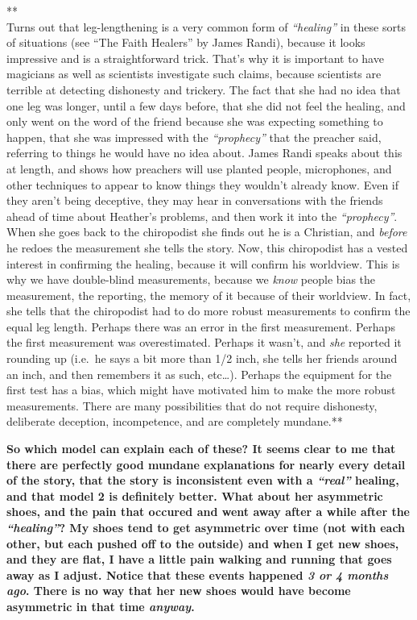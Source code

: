 **\\Turns out that leg-lengthening is a very common form of
\emph{``healing''} in these sorts of situations (see ``The Faith
Healers'' by James Randi), because it looks impressive and is a
straightforward trick. That's why it is important to have magicians as
well as scientists investigate such claims, because scientists are
terrible at detecting dishonesty and trickery. The fact that she had no
idea that one leg was longer, until a few days before, that she did not
feel the healing, and only went on the word of the friend because she
was expecting something to happen, that she was impressed with the
\emph{``prophecy''} that the preacher said, referring to things he would
have no idea about. James Randi speaks about this at length, and shows
how preachers will use planted people, microphones, and other techniques
to appear to know things they wouldn't already know. Even if they aren't
being deceptive, they may hear in conversations with the friends ahead
of time about Heather's problems, and then work it into the
\emph{``prophecy''}. When she goes back to the chiropodist she finds out
he is a Christian, and \emph{before} he redoes the measurement she tells
the story. Now, this chiropodist has a vested interest in confirming the
healing, because it will confirm his worldview. This is why we have
double-blind measurements, because we \emph{know} people bias the
measurement, the reporting, the memory of it because of their worldview.
In fact, she tells that the chiropodist had to do more robust
measurements to confirm the equal leg length. Perhaps there was an error
in the first measurement. Perhaps the first measurement was
overestimated. Perhaps it wasn't, and \emph{she} reported it rounding up
(i.e.~he says a bit more than 1/2 inch, she tells her friends around an
inch, and then remembers it as such, etc\ldots{}). Perhaps the equipment
for the first test has a bias, which might have motivated him to make
the more robust measurements. There are many possibilities that do not
require dishonesty, deliberate deception, incompetence, and are
completely mundane.**

\textbf{So which model can explain each of these? It seems clear to me
that there are perfectly good mundane explanations for nearly every
detail of the story, that the story is inconsistent even with a
\emph{``real''} healing, and that model 2 is definitely better. What
about her asymmetric shoes, and the pain that occured and went away
after a while after the \emph{``healing''}? My shoes tend to get
asymmetric over time (not with each other, but each pushed off to the
outside) and when I get new shoes, and they are flat, I have a little
pain walking and running that goes away as I adjust. Notice that these
events happened \emph{3 or 4 months ago}. There is no way that her new
shoes would have become asymmetric in that time \emph{anyway}.\\}

